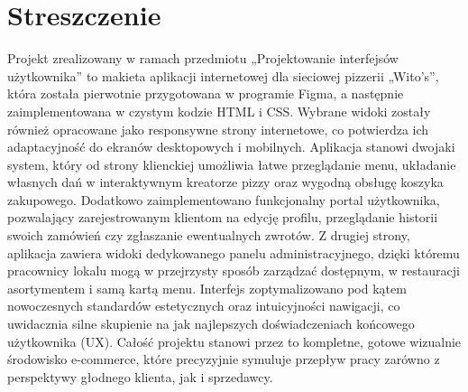 \chapter{Streszczenie}
Projekt zrealizowany w ramach przedmiotu „Projektowanie interfejsów użytkownika” to makieta aplikacji internetowej dla sieciowej pizzerii „Wito's”, która została pierwotnie przygotowana w programie Figma, a następnie zaimplementowana w czystym kodzie HTML i CSS. Wybrane widoki zostały również opracowane jako responsywne strony internetowe, co potwierdza ich adaptacyjność do ekranów desktopowych i mobilnych. Aplikacja stanowi dwojaki system, który od strony klienckiej umożliwia łatwe przeglądanie menu, układanie własnych dań w interaktywnym kreatorze pizzy oraz wygodną obsługę koszyka zakupowego. Dodatkowo zaimplementowano funkcjonalny portal użytkownika, pozwalający zarejestrowanym klientom na edycję profilu, przeglądanie historii swoich zamówień czy zgłaszanie ewentualnych zwrotów. Z drugiej strony, aplikacja zawiera widoki dedykowanego panelu administracyjnego, dzięki któremu pracownicy lokalu mogą w przejrzysty sposób zarządzać dostępnym, w restauracji asortymentem i samą kartą menu. Interfejs zoptymalizowano pod kątem nowoczesnych standardów estetycznych oraz intuicyjności nawigacji, co uwidacznia silne skupienie na jak najlepszych doświadczeniach końcowego użytkownika (UX). Całość projektu stanowi przez to kompletne, gotowe wizualnie środowisko e-commerce, które precyzyjnie symuluje przepływ pracy zarówno z perspektywy głodnego klienta, jak i sprzedawcy.

